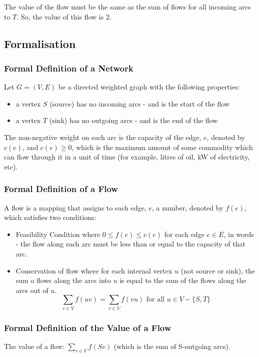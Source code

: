 The value of the flow must be the same as the sum of flows for all incoming arcs to $T$. So, the value of this flow is 2. 

\subsection{Formalisation}
\subsubsection{Formal Definition of a Network}
Let $G = (V, E)$ be a directed weighted graph with the following properties:
\begin{itemize}
    \item a vertex $S$ (source) has no incoming arcs - and is the start of the flow
    \item a vertex $T$ (sink) has no outgoing arcs - and is the end of the flow
\end{itemize}
The non-negative weight on each arc is the capacity of the edge, $e$, denoted by $c(e)$, and $c(e) \geq 0$, which is the maximum amount of some commodity which can flow through it in a unit of time (for example, litres of oil, kW of electricity, etc).

\subsubsection{Formal Definition of a Flow}
A flow is a mapping that assigns to each edge, $e$, a number, denoted by $f(e)$, which satisfies two conditions:
\begin{itemize}
    \item Feasibility Condition where $0 \leq f(e) \leq c(e)$ for each edge $e \in E$, in words - the flow along each arc must be less than or equal to the capacity of that arc.
    \item Conservation of flow where for each internal vertex $u$ (not source or sink), the sum o flows along the arcs into $u$ is equal to the sum of the flows along the arcs out of $u$.
    \[\sum_{v \in V} f(uv) = \sum_{v \in V} f(vu) \text{ for all } u \in V - \{S, T\}\]
\end{itemize}

\subsubsection{Formal Definition of the Value of a Flow}
The value of a flow: $\displaystyle \sum_{v \in V} f(Sv)$ (which is the sum of S-outgoing arcs).\\

